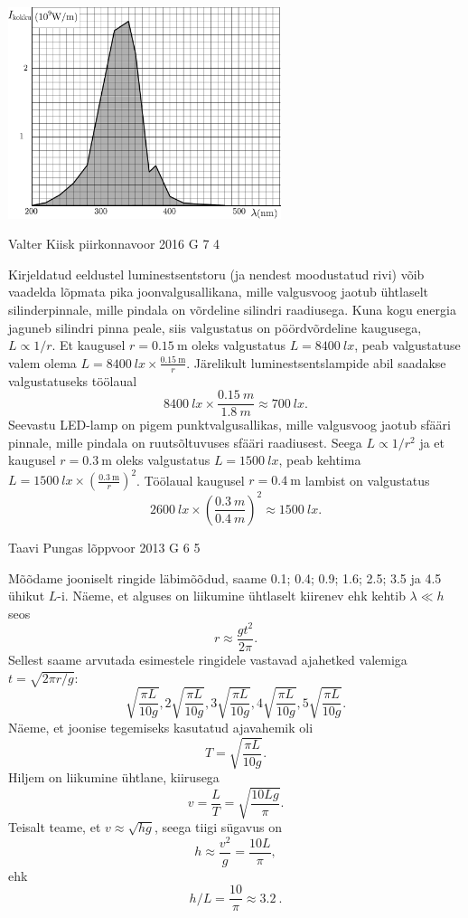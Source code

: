 \documentclass[11pt, twoside]{article}
\begin{document}
{{\begin{center}
	\includegraphics[width=80mm]{2011-lahg-04-intensity}
\end{center}
\fi
}

{Valter Kiisk} %
{piirkonnavoor} %
{2016} %
{G 7} %
{4} %
{

\ifSolution
Kirjeldatud eeldustel luminestsentstoru (ja nendest moodustatud rivi) võib vaadelda lõpmata pika joonvalgusallikana, mille valgusvoog jaotub ühtlaselt silinderpinnale, mille pindala on võrdeline silindri raadiusega. Kuna kogu energia jaguneb silindri pinna peale, siis valgustatus on pöördvõrdeline kaugusega, $L \propto 1/r$. Et kaugusel $r=\SI{0.15}{\meter}$ oleks valgustatus $L=\SI{8400}{lx}$, peab valgustatuse valem olema $L=\SI{8400}{lx}\times \frac{\SI{0.15}{\meter}} r$. Järelikult luminestsentslampide abil saadakse valgustatuseks töölaual
\[
\SI{8400}{lx}\times\frac{\SI{0.15}{m}}{\SI{1.8}{m}}\approx\SI{700}{lx}.
\]
Seevastu LED-lamp on pigem punktvalgusallikas, mille valgusvoog jaotub sfääri pinnale, mille pindala on ruutsõltuvuses sfääri raadiusest. Seega $L \propto 1/r^2$ ja et kaugusel $r=\SI{0.3}{\meter}$ oleks valgustatus $L=\SI{1500}{lx}$, peab kehtima $L=\SI{1500}{lx}\times \left(\frac{\SI{0.3}{\meter}} {r}\right)^2$. Töölaual kaugusel $r=\SI{0.4}{\meter}$ lambist on valgustatus
\[
\SI{2600}{lx}\times\left(\frac{\SI{0.3}{m}}{\SI{0.4}{m}}\right)^2\approx\SI{1500}{lx}.
\]
\fi
}

{Taavi Pungas} %
{lõppvoor} %
{2013} %
{G 6} %
{5} %
{

\ifSolution
Mõõdame jooniselt ringide läbimõõdud, saame \num{0,1}; \num{0,4}; \num{0,9}; \num{1,6}; \num{2,5}; \num{3,5} ja \num{4,5} ühikut $L$-i. Näeme, et alguses on liikumine ühtlaselt kiirenev ehk kehtib $\lambda \ll h$ seos
\[
r \approx \frac{gt^2}{2 \pi}.
\]
Sellest saame arvutada esimestele ringidele vastavad ajahetked valemiga $t = \sqrt{2 \pi r/g}$: 
\[
\sqrt{\frac{\pi L}{10 g}}, 2 \sqrt{\frac{\pi L}{10 g}}, 3 \sqrt{\frac{\pi L}{10 g}}, 4 \sqrt{\frac{\pi L}{10 g}}, 5 \sqrt{\frac{\pi L}{10 g}}.
\]
Näeme, et joonise tegemiseks kasutatud ajavahemik oli
\[
T=\sqrt{\frac{\pi L}{10 g}}.
\]
Hiljem on liikumine ühtlane, kiirusega
\[
v=\frac{L}{T}=\sqrt{\frac{10 L g}{\pi}}.
\]
Teisalt teame, et $v \approx \sqrt{hg}$, seega tiigi sügavus on
\[
h \approx \frac{v^2}{g} = \frac{10 L}{\pi},
\]
ehk 
\[
h/L = \frac{10}{\pi} \approx \SI{3,2}{}.
\]
\fi
}

}
\end{document}
